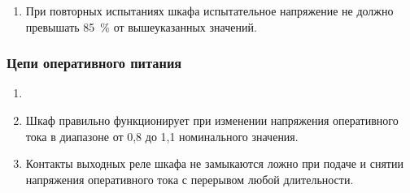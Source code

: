 \begin{enumerate}[label=\arabic{section}.\arabic{subsection}.\arabic{subsubsection}.\arabic*, align=left, labelsep=4pt, leftmargin=0pt, itemindent=2cm]
\begin{longtable}
\raggedright Электрическая прочность изоляции цепей с рабочим напряжением не более 60 В \\ по ГОСТ IEC 60255-5-2014, п. 6.1.4  		& \centering{} В действующего значения, 50 Гц, 1 мин  \\  \hhline{|-|-|}
\raggedright Электрическая прочность изоляции цепей с рабочим напряжением более 60 В \\ по ГОСТ IEC 60255-5-2014, п. 6.1.4   		& \centering{} В действующего значения, 50 Гц, 1 мин \\  \hhline{|-|-|}
\raggedright Импульсное напряжение 1,2/50 мкс для цепей с рабочим напряжением не более 60 В \\ по ГОСТ IEC 60255-5-2014, п. 6.1.3    & \centering{} кВ 									   \\  \hhline{|-|-|}
\raggedright Импульсное напряжение 1,2/50 мкс для цепей с рабочим напряжением более 60 В \\ по ГОСТ IEC 60255-5-2014, п. 6.1.3		& \centering{} кВ 									   \\  \hhline{|-|-|}

\end{longtable}
\normalsize
\setlength{\extrarowheight}{0.0cm} %

\item
При повторных испытаниях шкафа испытательное напряжение не должно превышать 85~\% от вышеуказанных значений.

\end{enumerate}

\subsubsection{Цепи оперативного питания}

\begin{enumerate}[label=\arabic{section}.\arabic{subsection}.\arabic{subsubsection}.\arabic*, align=left, labelsep=4pt, leftmargin=0pt, itemindent=2cm]

\item
{}

\item
Шкаф правильно функционирует при изменении напряжения оперативного тока в диапазоне от 0,8 до 1,1 номинального значения.

\item
Контакты выходных реле шкафа не замыкаются ложно при подаче и снятии напряжения оперативного тока с перерывом любой длительности.

\end{enumerate}

